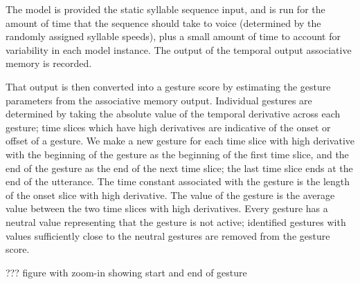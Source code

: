 The model is provided the static syllable sequence input,
and is run for the amount of time that the sequence
should take to voice (determined by the
randomly assigned syllable speeds),
plus a small amount of time to account
for variability in each model instance.
The output of the temporal output associative memory
is recorded.

That output is then converted into a gesture score
by estimating the gesture parameters
from the associative memory output.
Individual gestures are determined by
taking the absolute value of the temporal derivative
across each gesture;
time slices which have high derivatives
are indicative of the onset or offset of a gesture.
We make a new gesture for each
time slice with high derivative
with the beginning of the gesture as
the beginning of the first time slice,
and the end of the gesture
as the end of the next time slice;
the last time slice ends at the end
of the utterance.
The time constant associated
with the gesture
is the length of
the onset slice with high derivative.
The value of the gesture is the
average value between the two
time slices with high derivatives.
Every gesture has a neutral value
representing that the gesture
is not active;
identified gestures with values
sufficiently close to the neutral gestures
are removed from the gesture score.

??? figure with zoom-in showing start and end of gesture

